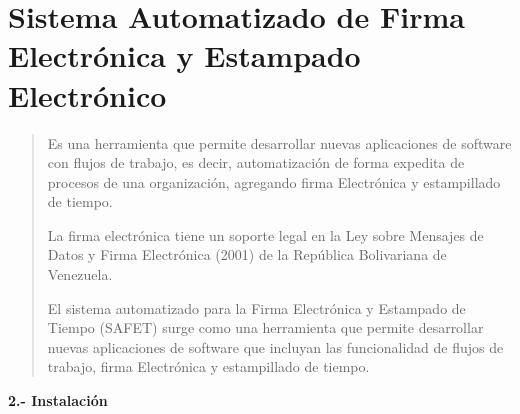 \documentclass[letterpaper,11pt,spanish]{sphinxmanual}
\begin{document}
\chapter{Sistema Automatizado de Firma Electrónica y Estampado Electrónico}
\label{_templates/Contenido1/Introduccion:sistema-automatizado-de-firma-electronica-y-estampado-electronico}\begin{quote}

Es una herramienta que permite desarrollar nuevas aplicaciones de software con flujos de trabajo, es decir, automatización de forma expedita de procesos de una organización, agregando firma Electrónica y estampillado de tiempo.

La firma electrónica tiene un soporte legal en la Ley sobre Mensajes de Datos y Firma Electrónica (2001) de la República Bolivariana de Venezuela.

El sistema automatizado para la Firma Electrónica y Estampado de Tiempo (SAFET) surge como una herramienta que permite desarrollar nuevas aplicaciones de software que incluyan las funcionalidad de flujos de trabajo, firma Electrónica y estampillado de tiempo.
\end{quote}

\textbf{2.- Instalación}
\end{document}
